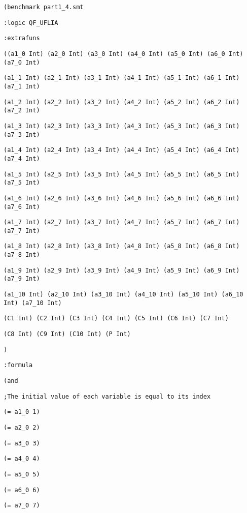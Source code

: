 {\footnotesize

{\tt (benchmark part1\_4.smt}

{\tt :logic QF\_UFLIA}

{\tt :extrafuns}

{\tt ((a1\_0 Int)  (a2\_0 Int)  (a3\_0 Int)  (a4\_0 Int)  (a5\_0 Int)  (a6\_0 Int)  (a7\_0 Int)}

{\tt (a1\_1 Int)  (a2\_1 Int)  (a3\_1 Int)  (a4\_1 Int)  (a5\_1 Int)  (a6\_1 Int)  (a7\_1 Int)}

{\tt (a1\_2 Int)  (a2\_2 Int)  (a3\_2 Int)  (a4\_2 Int)  (a5\_2 Int)  (a6\_2 Int)  (a7\_2 Int)}

{\tt (a1\_3 Int)  (a2\_3 Int)  (a3\_3 Int)  (a4\_3 Int)  (a5\_3 Int)  (a6\_3 Int)  (a7\_3 Int)}

{\tt (a1\_4 Int)  (a2\_4 Int)  (a3\_4 Int)  (a4\_4 Int)  (a5\_4 Int)  (a6\_4 Int)  (a7\_4 Int)}

{\tt (a1\_5 Int)  (a2\_5 Int)  (a3\_5 Int)  (a4\_5 Int)  (a5\_5 Int)  (a6\_5 Int)  (a7\_5 Int)}

{\tt (a1\_6 Int)  (a2\_6 Int)  (a3\_6 Int)  (a4\_6 Int)  (a5\_6 Int)  (a6\_6 Int)  (a7\_6 Int)}

{\tt (a1\_7 Int)  (a2\_7 Int)  (a3\_7 Int)  (a4\_7 Int)  (a5\_7 Int)  (a6\_7 Int)  (a7\_7 Int)}

{\tt (a1\_8 Int)  (a2\_8 Int)  (a3\_8 Int)  (a4\_8 Int)  (a5\_8 Int)  (a6\_8 Int)  (a7\_8 Int)}

{\tt (a1\_9 Int)  (a2\_9 Int)  (a3\_9 Int)  (a4\_9 Int)  (a5\_9 Int)  (a6\_9 Int)  (a7\_9 Int)}

{\tt (a1\_10 Int) (a2\_10 Int) (a3\_10 Int) (a4\_10 Int) (a5\_10 Int) (a6\_10 Int) (a7\_10 Int)}

{\tt (C1 Int)    (C2 Int)    (C3 Int)    (C4 Int)    (C5 Int)    (C6 Int)    (C7 Int)}

{\tt (C8 Int)    (C9 Int)    (C10 Int)   (P Int)}

{\tt )}

{\tt :formula}

{\tt (and }

{\tt ;The initial value of each variable is equal to its index}

{\tt (= a1\_0 1)}

{\tt (= a2\_0 2)}

{\tt (= a3\_0 3)}

{\tt (= a4\_0 4)}

{\tt (= a5\_0 5)}

{\tt (= a6\_0 6)}

{\tt (= a7\_0 7)}

}
